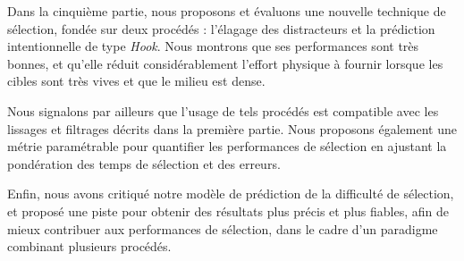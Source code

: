 	Dans la cinquième partie, nous proposons et évaluons une nouvelle technique de sélection, fondée sur deux procédés : l'élagage des distracteurs et la prédiction intentionnelle de type \emph{Hook}. Nous montrons que ses performances sont très bonnes, et qu'elle réduit considérablement l'effort physique à fournir lorsque les cibles sont très vives et que le milieu est dense.
	
	Nous signalons par ailleurs que l'usage de tels procédés est compatible avec les lissages et filtrages décrits dans la première partie. Nous proposons également une métrie paramétrable pour quantifier les performances de sélection en ajustant la pondération des temps de sélection et des erreurs.
	
	Enfin, nous avons critiqué notre modèle de prédiction de la difficulté de sélection, et proposé une piste pour obtenir des résultats plus précis et plus fiables, afin de mieux contribuer aux performances de sélection, dans le cadre d'un paradigme combinant plusieurs procédés.